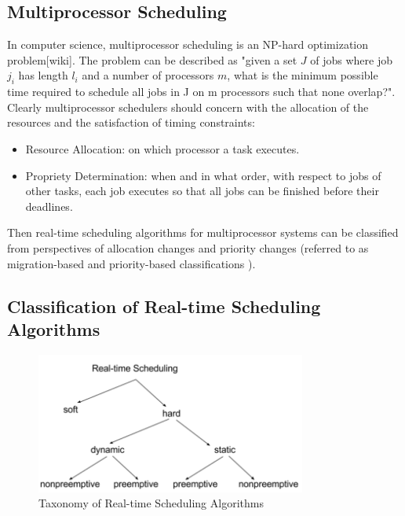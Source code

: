 \documentclass[preprint,12pt]{elsarticle}
\begin{document}
\subsection{Multiprocessor Scheduling}

In computer science, multiprocessor scheduling is an NP-hard optimization problem[wiki]. The problem can be described as "given a set $J$ of jobs where job $j_i$ has length $l_i$ and a number of processors $m$, what is the minimum possible time required to schedule all jobs in J on m processors such that none overlap?"\cite{garey1979computers}. Clearly multiprocessor schedulers should concern with the allocation of the resources and the satisfaction of timing constraints\cite{davis2011survey}:

\begin{itemize}

\item Resource Allocation: on which processor a task executes.
\item Propriety Determination: when and in what order, with respect to jobs of other tasks, each job executes so that all jobs can be finished before their deadlines.

\end{itemize}

Then real-time scheduling algorithms for multiprocessor systems can be classified from perspectives of allocation changes and priority changes (referred to as migration-based and priority-based classifications \cite{carpenter2004categorization}).

\subsection{Classification of Real-time Scheduling Algorithms}

\begin{figure}
\centering
\includegraphics[width=3.5in]{classification}
\caption{Taxonomy of Real-time Scheduling Algorithms}
\label{classification}
\end{figure}
\end{document}
